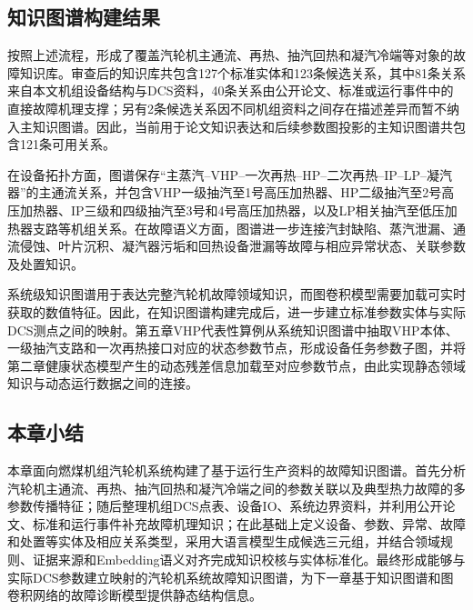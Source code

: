 \subsection{知识图谱构建结果}
\label{subsec:kg_result_v6}

按照上述流程，形成了覆盖汽轮机主通流、再热、抽汽回热和凝汽冷端等对象的故障知识库。审查后的知识库共包含127个标准实体和123条候选关系，其中81条关系来自本文机组设备结构与DCS资料，40条关系由公开论文、标准或运行事件中的直接故障机理支撑；另有2条候选关系因不同机组资料之间存在描述差异而暂不纳入主知识图谱。因此，当前用于论文知识表达和后续参数图投影的主知识图谱共包含121条可用关系。

在设备拓扑方面，图谱保存“主蒸汽--VHP--一次再热--HP--二次再热--IP--LP--凝汽器”的主通流关系，并包含VHP一级抽汽至1号高压加热器、HP二级抽汽至2号高压加热器、IP三级和四级抽汽至3号和4号高压加热器，以及LP相关抽汽至低压加热器支路等机组关系。在故障语义方面，图谱进一步连接汽封缺陷、蒸汽泄漏、通流侵蚀、叶片沉积、凝汽器污垢和回热设备泄漏等故障与相应异常状态、关联参数及处置知识。

系统级知识图谱用于表达完整汽轮机故障领域知识，而图卷积模型需要加载可实时获取的数值特征。因此，在知识图谱构建完成后，进一步建立标准参数实体与实际DCS测点之间的映射。第五章VHP代表性算例从系统知识图谱中抽取VHP本体、一级抽汽支路和一次再热接口对应的状态参数节点，形成设备任务参数子图，并将第二章健康状态模型产生的动态残差信息加载至对应参数节点，由此实现静态领域知识与动态运行数据之间的连接。

\subsection{本章小结}

本章面向燃煤机组汽轮机系统构建了基于运行生产资料的故障知识图谱。首先分析汽轮机主通流、再热、抽汽回热和凝汽冷端之间的参数关联以及典型热力故障的多参数传播特征；随后整理机组DCS点表、设备IO、系统边界资料，并利用公开论文、标准和运行事件补充故障机理知识；在此基础上定义设备、参数、异常、故障和处置等实体及相应关系类型，采用大语言模型生成候选三元组，并结合领域规则、证据来源和Embedding语义对齐完成知识校核与实体标准化。最终形成能够与实际DCS参数建立映射的汽轮机系统故障知识图谱，为下一章基于知识图谱和图卷积网络的故障诊断模型提供静态结构信息。